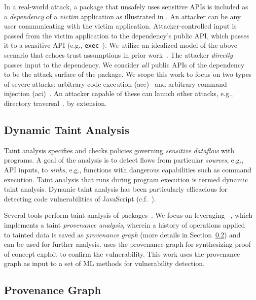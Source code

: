 \documentclass[12pt,openany,oneside,table]{cmuthesis}
\begin{document}
In a real-world attack, 
a \nodejs package that unsafely uses sensitive 
\nodejs APIs is included as a \emph{dependency} of a \emph{victim} application as illustrated in .
An attacker can be any user communicating with the 
victim application.
Attacker-controlled input is passed
from the victim application to the dependency's public API, which passes it to a
sensitive API (e.g., \lstinline|exec|~\cite{exec_fn}).
We utilize an idealized model of the above scenario that echoes trust assumptions in prior work~\cite{staicu-SYNODE,nodemedic-fine,cassel2023nodemedic}. 
The attacker \emph{directly} passes input to the dependency.
We consider \emph{all} public APIs of the dependency to be the attack surface of the package.
We scope this work to focus on two types of severe attacks: arbitrary code execution (\gls{ace})~\cite{cwe_94}
and arbitrary command injection (\gls{aci})~\cite{cwe_77}. An attacker capable of these can launch
other attacks, e.g., directory traversal~\cite{cwe_22}, by extension.

\subsection{Dynamic Taint Analysis}
Taint analysis specifies and checks policies governing \emph{sensitive 
dataflow} with programs. A goal of the analysis is to detect flows from particular \emph{sources}, e.g., 
API inputs, to \emph{sinks}, e.g., functions with dangerous capabilities such as command execution.
Taint analysis that runs during program execution is termed dynamic
taint analysis. 
Dynamic taint analysis has been particularly efficacious for detecting code vulnerabilities of 
JavaScript (c.f.~\cite{andreasen-Survey}).

Several tools perform taint analysis of \nodejs
packages~\cite{karim-PlatformIndependent,nielsen-Nodest,gauthier-AFFOGATO,song_ObjLupAnsys,ming_taintpipe,jsprime_2013,staicu-Extracting}.
We focus on leveraging \nodemedicfine~\cite{nodemedic-fine}, which implements a taint
\emph{provenance analysis}, wherein a history of operations applied to tainted
data is saved as \emph{provenance graph} (more details in Section~\ref{subsec:provenance-analysis}) and can be used for further analysis. 
\nodemedicfine uses the provenance graph for synthesizing proof of concept exploit to confirm the vulnerability. 
This work uses the provenance graph as input to a set of ML methods for vulnerability detection.



\subsection{Provenance Graph}
\label{subsec:provenance-analysis}
\end{document}
